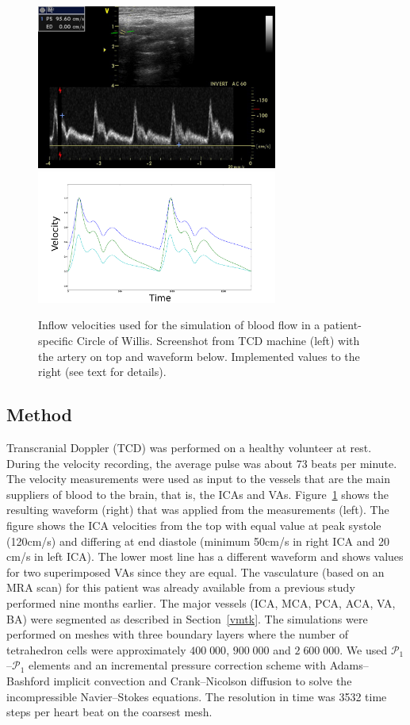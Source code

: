 \begin{figure}
  \begin{center}
      \includegraphics[width=7.9cm]{chapters/kvs-2/pdf/ica.pdf}
      \includegraphics[width=7.9cm]{chapters/kvs-2/pdf/cok_inflow.pdf}
  \end{center}
  \caption{Inflow velocities used for the simulation of blood flow in
    a patient-specific Circle of Willis. Screenshot from TCD machine
    (left) with the artery on top and waveform below. Implemented
    values to the right (see text for details).}
  \label{fig:kvs-2:cok_inflow}
\end{figure}

\subsection{Method}

Transcranial Doppler (TCD) was performed on a healthy volunteer at
rest. During the velocity recording, the average pulse was about 73
beats per minute. The velocity measurements
were used as input to the vessels that are the main suppliers
of blood to the brain, that is, the ICAs and
VAs. Figure~\ref{fig:kvs-2:cok_inflow} shows the resulting waveform
(right) that was applied from the measurements (left). The figure
shows the ICA velocities from the top with equal value at peak systole
(120cm/s) and differing at end diastole (minimum 50cm/s in right ICA
and 20 cm/s in left ICA). The lower most line has a different waveform
and shows values for two superimposed VAs since they are equal. The
vasculature (based on an MRA scan) for this patient was already available from a
previous study performed nine months earlier. The major vessels (ICA,
MCA, PCA, ACA, VA, BA) were segmented as described in
Section~\ref{vmtk}. The simulations were performed on meshes with
three boundary layers where the number of tetrahedron cells were approximately
$400\;000$, $900\;000$ and $2\;600\;000$. We used
$\mathcal{P}_1$--$\mathcal{P}_1$ elements and an incremental pressure
correction scheme with Adams--Bashford implicit convection and
Crank--Nicolson diffusion to solve the incompressible Navier--Stokes
equations. The resolution in time was 3532 time steps per heart beat
on the coarsest mesh.

